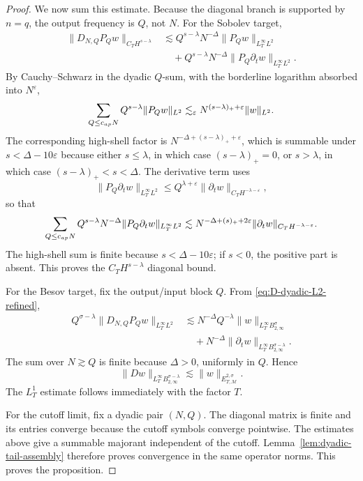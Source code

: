 \documentclass[10pt,a4paper]{amsart}
\newcommand{\cM}{\mathcal M}
\newcommand{\eps}{\varepsilon}
\begin{document}
\begin{proof}
We now sum this estimate.  Because the diagonal branch is supported by \(n=q\), the output frequency is \(Q\), not \(N\).  For the Sobolev target,
\begin{equation}\label{eq:D-H-weighted}
\begin{aligned}
        \|D_{N,Q}P_Qw\|_{C_TH^{s-\lambda}}
        &\lesssim Q^{s-\lambda}N^{-\Delta}\|P_Qw\|_{L_T^\infty L^2} \\
        &\quad +Q^{s-\lambda}N^{-\Delta}\|P_Q\partial_tw\|_{L_T^\infty L^2}.
\end{aligned}
\end{equation}
By Cauchy--Schwarz in the dyadic \(Q\)-sum, with the borderline logarithm
absorbed into \(N^\eps\),
\begin{equation}\label{eq:D-first-sum}
        \sum_{Q\le c_{\rm ap}N}Q^{s-\lambda}\|P_Qw\|_{L^2}
        \lesssim_\eps N^{(s-\lambda)_++\eps}\|w\|_{L^2}.
\end{equation}
The corresponding high-shell factor is \(N^{-\Delta+(s-\lambda)_++\eps}\), which is summable under \(s<\Delta-10\eps\) because either \(s\le\lambda\), in which case \((s-\lambda)_+=0\), or \(s>\lambda\), in which case \((s-\lambda)_+<s<\Delta\).  The derivative term uses
\begin{equation}\label{eq:D-dt-weighted}
        \|P_Q\partial_tw\|_{L_T^\infty L^2}
        \le Q^{\lambda+\eps}\|\partial_tw\|_{C_TH^{-\lambda-\eps}},
\end{equation}
so that
\begin{equation}\label{eq:D-der-sum}
        \sum_{Q\le c_{\rm ap}N}Q^{s-\lambda}N^{-\Delta}
        \|P_Q\partial_tw\|_{L_T^\infty L^2}
        \lesssim N^{-\Delta+(s)_++2\eps}
        \|\partial_tw\|_{C_TH^{-\lambda-\eps}}.
\end{equation}
The high-shell sum is finite because \(s<\Delta-10\eps\); if \(s<0\), the positive part is absent.  This proves the \(C_TH^{s-\lambda}\) diagonal bound.

For the Besov target, fix the output/input block \(Q\).  From \eqref{eq:D-dyadic-L2-refined},
\begin{equation}\label{eq:D-Besov-refined}
\begin{aligned}
        Q^{\sigma-\lambda}\|D_{N,Q}P_Qw\|_{L_T^\infty L^2}
        &\lesssim N^{-\Delta}Q^{-\lambda}
        \|w\|_{L_T^\infty B^\sigma_{2,\infty}} \\
        &\quad +N^{-\Delta}
        \|\partial_tw\|_{L_T^\infty B^{\sigma-\lambda}_{2,\infty}}.
\end{aligned}
\end{equation}
The sum over \(N\gtrsim Q\) is finite because \(\Delta>0\), uniformly in \(Q\).  Hence
\[
        \|D w\|_{L_T^\infty B^{\sigma-\lambda}_{2,\infty}}
        \lesssim \|w\|_{E_{T,\cM}^{2,\sigma}}.
\]
The \(L_T^1\) estimate follows immediately with the factor \(T\).

For the cutoff limit, fix a dyadic pair \((N,Q)\).  The diagonal matrix is finite and its entries converge because the cutoff symbols converge pointwise.  The estimates above give a summable majorant independent of the cutoff.  Lemma~\ref{lem:dyadic-tail-assembly} therefore proves convergence in the same operator norms.  This proves the proposition.
\end{proof}
\end{document}
